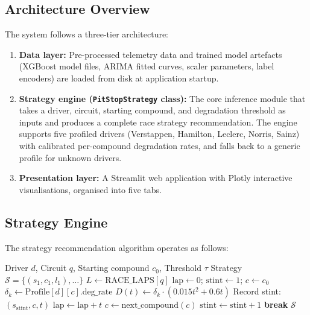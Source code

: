 \documentclass[journal,twoside]{IEEEtran}
\begin{document}
\subsection{Architecture Overview}

The system follows a three-tier architecture:

\begin{enumerate}
  \item \textbf{Data layer:}  Pre-processed telemetry data and trained
  model artefacts (XGBoost model files, ARIMA fitted curves, scaler
  parameters, label encoders) are loaded from disk at application
  startup.

  \item \textbf{Strategy engine (\texttt{PitStopStrategy} class):}
  The core inference module that takes a driver, circuit, starting
  compound, and degradation threshold as inputs and produces a complete
  race strategy recommendation.  The engine supports five profiled
  drivers (Verstappen, Hamilton, Leclerc, Norris, Sainz) with
  calibrated per-compound degradation rates, and falls back to a generic
  profile for unknown drivers.

  \item \textbf{Presentation layer:}  A Streamlit web application with
  Plotly interactive visualisations, organised into five tabs.
\end{enumerate}

\subsection{Strategy Engine}\label{sec:strategy_engine}

The strategy recommendation algorithm operates as follows:

\begin{algorithm}[!t]
\caption{Pit Stop Strategy Generation}
\label{alg:strategy}
\begin{algorithmic}[1]
\REQUIRE Driver $d$, Circuit $q$, Starting compound $c_0$, Threshold $\tau$
\ENSURE Strategy $\mathcal{S} = \{(s_1, c_1, l_1), \ldots\}$
\STATE $L \leftarrow \text{RACE\_LAPS}[q]$ 
\STATE $\text{lap} \leftarrow 0$; $\text{stint} \leftarrow 1$; $c \leftarrow c_0$
  \STATE $\delta_k \leftarrow \text{Profile}[d][c].\text{deg\_rate}$
    \STATE $D(t) \leftarrow \delta_k \cdot (0.015 t^2 + 0.6 t)$
      \STATE Record stint: $(s_{\text{stint}}, c, t)$
      \STATE $\text{lap} \leftarrow \text{lap} + t$
      \STATE $c \leftarrow \text{next\_compound}(c)$
      \STATE $\text{stint} \leftarrow \text{stint} + 1$
      \STATE \textbf{break}
    \ENDIF
  \ENDFOR
\ENDWHILE
\RETURN $\mathcal{S}$
\end{algorithmic}
\end{algorithm}
\end{document}
